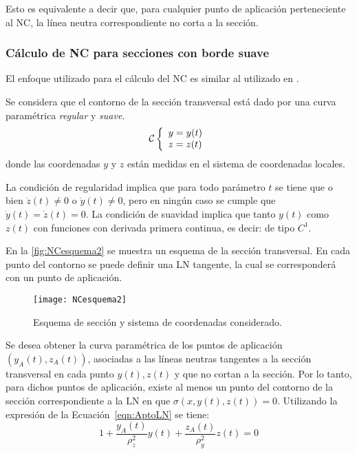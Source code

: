 Esto es equivalente a decir que, para cualquier punto de aplicación perteneciente al NC, la línea neutra correspondiente no corta a la sección.


\subsubsection{Cálculo de NC para secciones con borde suave}

El enfoque utilizado para el cálculo del NC es similar al utilizado en \citep{massood2001}. %
%

Se considera que el contorno de la sección transversal está dado por una curva paramétrica \textit{regular} y \textit{suave}. %
%
\begin{equation}
\mcC %
\left\{
\begin{array}{l}
y = y(t) \\
z = z(t) 
\end{array}
\right.
\end{equation}
donde las coordenadas $y$ y $z$ están medidas en el sistema de coordenadas locales.

La condición de regularidad implica que para todo parámetro $t$ se tiene que o bien $\dot{z}(t)\neq 0$ o $\dot{y}(t)\neq 0$, pero en ningún caso se cumple que $\dot{y}(t) = \dot{z}(t) = 0$. %
%
La condición de suavidad implica que tanto  $y(t)$ como $z(t)$ con funciones con derivada primera continua, es decir: de tipo $C^1$.

En la \autoref{fig:NCesquema2} se muestra un esquema de la sección transversal. %
%
En cada punto del contorno se puede definir una LN tangente, la cual se corresponderá con un punto de aplicación.

\begin{figure}[htb]
	\centering
	\texttt{[image: NCesquema2]}
	\caption{Esquema de sección y sistema de coordenadas considerado.}
	\label{fig:NCesquema2}
\end{figure}

Se desea obtener la curva paramétrica de los puntos de aplicación $(y_A(t),z_A(t))$, asociadas a las líneas neutras tangentes a la sección transversal en cada punto $y(t),z(t)$ y que no cortan a la sección. Por lo tanto, para dichos puntos de aplicación, existe al menos un punto del contorno de la sección correspondiente a la LN en que $\sigma(x,y(t),z(t)) = 0$. Utilizando la expresión de la Ecuación~\eqref{eqn:AptoLN} se tiene:
%
\begin{equation}
1 +  \frac{ y_A(t)}{\rho_z^2} y(t) +  \frac{ z_A(t)}{\rho_y^2} z(t) = 0
\end{equation}


